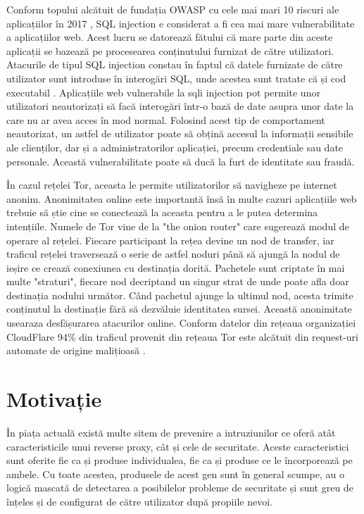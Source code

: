 Conform topului alcătuit de fundația OWASP cu cele mai mari 10 riscuri ale aplicațiilor în 2017 \cite{owasp}, SQL injection e considerat a fi cea mai mare vulnerabilitate a aplicațiilor web. Acest lucru se datorează fătului că mare parte din aceste aplicații se bazează pe procesearea conținutului furnizat de către utilizatori. Atacurile de tipul SQL injection constau în faptul că datele furnizate de către utilizator sunt introduse în interogări SQL, unde acestea sunt tratate că și cod executabil \cite{classification_and_countermeasures}. Aplicațiile web vulnerabile la sqli injection pot permite unor utilizatori neautorizați să facă interogări într-o bază de date asupra unor date la care nu ar avea acces în mod normal. Folosind acest tip de comportament neautorizat, un astfel de utilizator poate să obțină accesul la informații sensibile ale clienților, dar și a administratorilor aplicației, precum credentiale sau date personale. Această vulnerabilitate poate să ducă la furt de identitate sau fraudă.  
 
În cazul rețelei Tor, aceasta le permite utilizatorilor să navigheze pe internet anonim. Anonimitatea online este importantă însă în multe cazuri aplicațiile web trebuie să știe cine se conectează la aceasta pentru a le putea determina intențiile. Numele de Tor vine de la "the onion router" care sugerează modul de operare al rețelei. Fiecare participant la rețea devine un nod de transfer, iar traficul rețelei traversează o serie de astfel noduri până să ajungă la nodul de ieșire ce crează conexiunea cu destinația dorită. Pachetele sunt criptate în mai multe "straturi", fiecare nod decriptand un singur strat de unde poate afla doar destinația nodului următor. Când pachetul ajunge la ultimul nod, acesta trimite conținutul la destinație fără să dezvăluie identitatea sursei. Această anonimitate usearaza desfășurarea atacurilor online. Conform datelor din rețeaua organizației CloudFlare 94\% din traficul provenit din rețeaua Tor este alcătuit din request-uri automate de origine malițioasă \cite{tor_trouble}. 

 \section{Motivație}
În piața actuală există multe sitem de prevenire a intruziunilor ce oferă atât caracteristicile unui reverse proxy, cât și cele de securitate. Aceste caracteristici sunt oferite fie ca și produse individualea, fie ca și produse ce le încorporează pe ambele. Cu toate acestea, produsele de acest gen sunt în general scumpe, au o logică mascată de detectarea a posibilelor probleme de securitate și sunt greu de înțeles și de configurat de către utilizator după propiile nevoi. 

